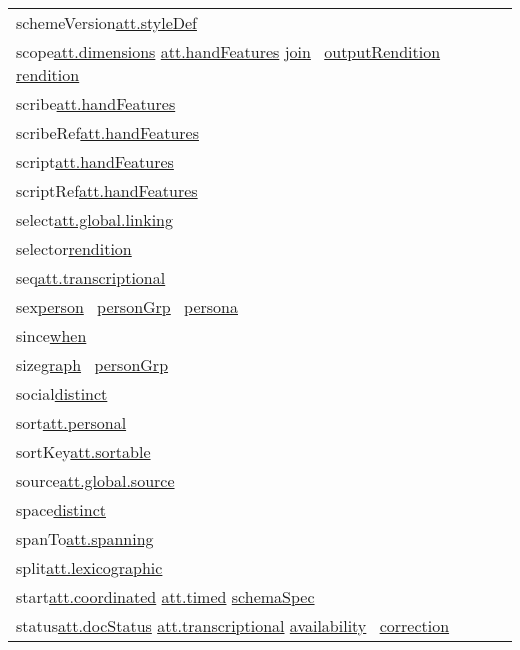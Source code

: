 \begin{longtable}{L{.2\textwidth}P{.8\textwidth}}
schemeVersion\tabcellsep \hyperref[TEI.att.styleDef]{att.styleDef}\\
scope\tabcellsep \hyperref[TEI.att.dimensions]{att.dimensions} \hyperref[TEI.att.handFeatures]{att.handFeatures} \hyperref[TEI.join]{join}  \hyperref[TEI.outputRendition]{outputRendition}  \hyperref[TEI.rendition]{rendition} \\
scribe\tabcellsep \hyperref[TEI.att.handFeatures]{att.handFeatures}\\
scribeRef\tabcellsep \hyperref[TEI.att.handFeatures]{att.handFeatures}\\
script\tabcellsep \hyperref[TEI.att.handFeatures]{att.handFeatures}\\
scriptRef\tabcellsep \hyperref[TEI.att.handFeatures]{att.handFeatures}\\
select\tabcellsep \hyperref[TEI.att.global.linking]{att.global.linking}\\
selector\tabcellsep \hyperref[TEI.rendition]{rendition} \\
seq\tabcellsep \hyperref[TEI.att.transcriptional]{att.transcriptional}\\
sex\tabcellsep \hyperref[TEI.person]{person}  \hyperref[TEI.personGrp]{personGrp}  \hyperref[TEI.persona]{persona} \\
since\tabcellsep \hyperref[TEI.when]{when} \\
size\tabcellsep \hyperref[TEI.graph]{graph}  \hyperref[TEI.personGrp]{personGrp} \\
social\tabcellsep \hyperref[TEI.distinct]{distinct} \\
sort\tabcellsep \hyperref[TEI.att.personal]{att.personal}\\
sortKey\tabcellsep \hyperref[TEI.att.sortable]{att.sortable}\\
source\tabcellsep \hyperref[TEI.att.global.source]{att.global.source}\\
space\tabcellsep \hyperref[TEI.distinct]{distinct} \\
spanTo\tabcellsep \hyperref[TEI.att.spanning]{att.spanning}\\
split\tabcellsep \hyperref[TEI.att.lexicographic]{att.lexicographic}\\
start\tabcellsep \hyperref[TEI.att.coordinated]{att.coordinated} \hyperref[TEI.att.timed]{att.timed} \hyperref[TEI.schemaSpec]{schemaSpec} \\
status\tabcellsep \hyperref[TEI.att.docStatus]{att.docStatus} \hyperref[TEI.att.transcriptional]{att.transcriptional} \hyperref[TEI.availability]{availability}  \hyperref[TEI.correction]{correction} \\

\end{longtable}
